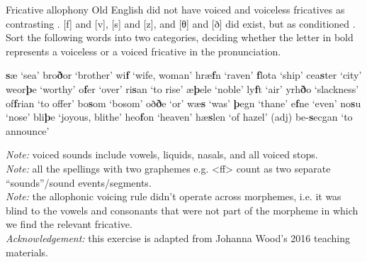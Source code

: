\begin{exercises}{Fricative allophony}\label{exercise-OE-fricatives}
Old English did not have voiced and voiceless fricatives as contrasting . [f] and [v], [s] and [z], and [θ] and [ð] did exist, but as conditioned . Sort the following words into two categories, deciding whether the letter in bold represents a voiceless or a voiced fricative in the pronunciation. 


\noindent
 \textbf{s}æ \tab  `sea' \tab
 bro\textbf{ð}or \tab  `brother' \tab
 wi\textbf{f} \tab  `wife, woman' \tab
 hræ\textbf{f}n \tab  `raven' \tab
 \textbf{f}lota \tab  `ship' \tab
 cea\textbf{s}ter \tab  `city' \tab
 weor\textbf{þ}e \tab  `worthy' \tab
 o\textbf{f}er \tab  `over' \tab
 ri\textbf{s}an \tab  `to rise' \tab
 æ\textbf{þ}ele \tab  `noble' \tab
 ly\textbf{f}t \tab  `air' \tab
 yrh\textbf{ð}o \tab  `slackness' \tab
%
 of\textbf{f}rian \tab  `to offer' \tab
 bo\textbf{s}om \tab  `bosom' \tab
 oð\textbf{ð}e \tab  `or' \tab
 wæ\textbf{s} \tab  `was' \tab
 \textbf{þ}egn \tab  `thane' \tab
 e\textbf{f}ne \tab  `even' \tab
 no\textbf{s}u \tab  `nose' \tab
 bli\textbf{þ}e \tab  `joyous, blithe' \tab
 heo\textbf{f}on \tab  `heaven' \tab
 hæ\textbf{s}len \tab  `of hazel' (adj)\tab
 be-\textbf{s}ecgan \tab  `to announce' \tab

\noindent\emph{Note:} voiced sounds include vowels, liquids, nasals, and all voiced stops.\\

\noindent\emph{Note:} all the spellings with two graphemes e.g. <ff> count as two separate ``sounds''/sound events/segments.\\

\noindent\emph{Note:} the allophonic voicing rule didn't operate across morphemes, i.e. it was blind to the vowels and consonants that were not part of the morpheme in which we find the relevant fricative.\\

\noindent\emph{Acknowledgement:} this exercise is adapted from Johanna Wood's 2016 teaching materials.

\end{exercises}


